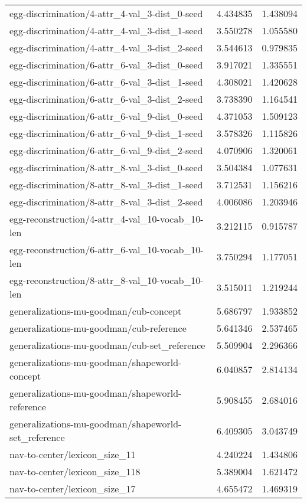 \begin{tabular}{lrr}
egg-discrimination/4-attr\_4-val\_3-dist\_0-seed & 4.434835 & 1.438094 \\
egg-discrimination/4-attr\_4-val\_3-dist\_1-seed & 3.550278 & 1.055580 \\
egg-discrimination/4-attr\_4-val\_3-dist\_2-seed & 3.544613 & 0.979835 \\
egg-discrimination/6-attr\_6-val\_3-dist\_0-seed & 3.917021 & 1.335551 \\
egg-discrimination/6-attr\_6-val\_3-dist\_1-seed & 4.308021 & 1.420628 \\
egg-discrimination/6-attr\_6-val\_3-dist\_2-seed & 3.738390 & 1.164541 \\
egg-discrimination/6-attr\_6-val\_9-dist\_0-seed & 4.371053 & 1.509123 \\
egg-discrimination/6-attr\_6-val\_9-dist\_1-seed & 3.578326 & 1.115826 \\
egg-discrimination/6-attr\_6-val\_9-dist\_2-seed & 4.070906 & 1.320061 \\
egg-discrimination/8-attr\_8-val\_3-dist\_0-seed & 3.504384 & 1.077631 \\
egg-discrimination/8-attr\_8-val\_3-dist\_1-seed & 3.712531 & 1.156216 \\
egg-discrimination/8-attr\_8-val\_3-dist\_2-seed & 4.006086 & 1.203946 \\
egg-reconstruction/4-attr\_4-val\_10-vocab\_10-len & 3.212115 & 0.915787 \\
egg-reconstruction/6-attr\_6-val\_10-vocab\_10-len & 3.750294 & 1.177051 \\
egg-reconstruction/8-attr\_8-val\_10-vocab\_10-len & 3.515011 & 1.219244 \\
generalizations-mu-goodman/cub-concept & 5.686797 & 1.933852 \\
generalizations-mu-goodman/cub-reference & 5.641346 & 2.537465 \\
generalizations-mu-goodman/cub-set\_reference & 5.509904 & 2.296366 \\
generalizations-mu-goodman/shapeworld-concept & 6.040857 & 2.814134 \\
generalizations-mu-goodman/shapeworld-reference & 5.908455 & 2.684016 \\
generalizations-mu-goodman/shapeworld-set\_reference & 6.409305 & 3.043749 \\
nav-to-center/lexicon\_size\_11 & 4.240224 & 1.434806 \\
nav-to-center/lexicon\_size\_118 & 5.389004 & 1.621472 \\
nav-to-center/lexicon\_size\_17 & 4.655472 & 1.469319 \\

\end{tabular}
